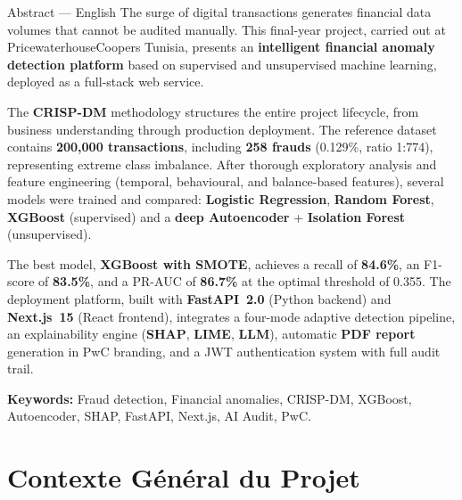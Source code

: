 \documentclass[12pt,a4paper,twoside]{report}
\theoremstyle{definition}
\begin{document}
\begin{pwcbox}{Abstract — English}
The surge of digital transactions generates financial data volumes that cannot
be audited manually. This final-year project, carried out at PricewaterhouseCoopers
Tunisia, presents an \textbf{intelligent financial anomaly detection platform}
based on supervised and unsupervised machine learning, deployed as a full-stack
web service.

The \textbf{CRISP-DM} methodology structures the entire project lifecycle, from
business understanding through production deployment. The reference dataset contains
\textbf{200,000 transactions}, including \textbf{258 frauds} (0.129\%, ratio 1:774),
representing extreme class imbalance. After thorough exploratory analysis and feature
engineering (temporal, behavioural, and balance-based features), several models were
trained and compared: \textbf{Logistic Regression}, \textbf{Random Forest},
\textbf{XGBoost} (supervised) and a \textbf{deep Autoencoder} + \textbf{Isolation Forest}
(unsupervised).

The best model, \textbf{XGBoost with SMOTE}, achieves a recall of \textbf{84.6\%},
an F1-score of \textbf{83.5\%}, and a PR-AUC of \textbf{86.7\%} at the optimal
threshold of 0.355. The deployment platform, built with \textbf{FastAPI~2.0} (Python
backend) and \textbf{Next.js~15} (React frontend), integrates a four-mode adaptive
detection pipeline, an explainability engine (\textbf{SHAP}, \textbf{LIME},
\textbf{LLM}), automatic \textbf{PDF report} generation in PwC branding, and a JWT
authentication system with full audit trail.

\textbf{Keywords:} Fraud detection, Financial anomalies, CRISP-DM, XGBoost,
Autoencoder, SHAP, FastAPI, Next.js, AI Audit, PwC.
\end{pwcbox}

\printglossary[type=\acronymtype,title={Liste des Acronymes},
               toctitle={Liste des Acronymes}]

\tableofcontents
\listoffigures
\listoftables

\cleardoublepage
{}
\setcounter{page}{1}
\pagestyle{fancy}

\chapter{Contexte Général du Projet}
\label{chap:contexte}
\end{document}

